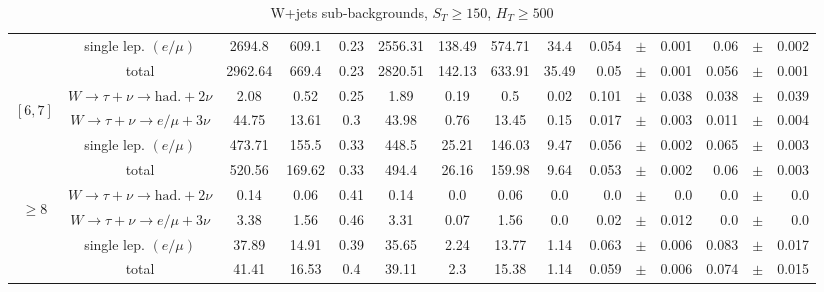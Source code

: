 \documentclass[12pt]{paper}
\begin{document}
\begin{table}[ht]
\begin{center}
{\begin{tabular}{|c|c|c|c|c|c|c|c|c|rrr|rrr|}
\cline{2-15}
 &single lep. $(e/\mu)$ & 2694.8 & 609.1 & 0.23 & 2556.31 & 138.49 & 574.71 & 34.4 & 0.054 & $\pm$ & 0.001 & 0.06 & $\pm$ & 0.002\\
\cline{2-15}
 &total & 2962.64 & 669.4 & 0.23 & 2820.51 & 142.13 & 633.91 & 35.49 & 0.05 & $\pm$ & 0.001 & 0.056 & $\pm$ & 0.001\\
\hline
\hline\multirow{4}{*}{\begin{sideways}$[6,7]$\end{sideways}}
 &$W\rightarrow \tau + \nu \rightarrow \textrm{had.}+2\nu$ & 2.08 & 0.52 & 0.25 & 1.89 & 0.19 & 0.5 & 0.02 & 0.101 & $\pm$ & 0.038 & 0.038 & $\pm$ & 0.039\\
\cline{2-15}
 &$W\rightarrow \tau + \nu \rightarrow e/\mu+3\nu$ & 44.75 & 13.61 & 0.3 & 43.98 & 0.76 & 13.45 & 0.15 & 0.017 & $\pm$ & 0.003 & 0.011 & $\pm$ & 0.004\\
\cline{2-15}
 &single lep. $(e/\mu)$ & 473.71 & 155.5 & 0.33 & 448.5 & 25.21 & 146.03 & 9.47 & 0.056 & $\pm$ & 0.002 & 0.065 & $\pm$ & 0.003\\
\cline{2-15}
 &total & 520.56 & 169.62 & 0.33 & 494.4 & 26.16 & 159.98 & 9.64 & 0.053 & $\pm$ & 0.002 & 0.06 & $\pm$ & 0.003\\
\hline
\hline\multirow{4}{*}{\begin{sideways}$\geq8$\end{sideways}}
 &$W\rightarrow \tau + \nu \rightarrow \textrm{had.}+2\nu$ & 0.14 & 0.06 & 0.41 & 0.14 & 0.0 & 0.06 & 0.0 & 0.0 & $\pm$ & 0.0 & 0.0 & $\pm$ & 0.0\\
\cline{2-15}
 &$W\rightarrow \tau + \nu \rightarrow e/\mu+3\nu$ & 3.38 & 1.56 & 0.46 & 3.31 & 0.07 & 1.56 & 0.0 & 0.02 & $\pm$ & 0.012 & 0.0 & $\pm$ & 0.0\\
\cline{2-15}
 &single lep. $(e/\mu)$ & 37.89 & 14.91 & 0.39 & 35.65 & 2.24 & 13.77 & 1.14 & 0.063 & $\pm$ & 0.006 & 0.083 & $\pm$ & 0.017\\
\cline{2-15}
 &total & 41.41 & 16.53 & 0.4 & 39.11 & 2.3 & 15.38 & 1.14 & 0.059 & $\pm$ & 0.006 & 0.074 & $\pm$ & 0.015\\
\hline
\end{tabular}}
\end{center}
\vspace{2pt}
\caption{W+jets sub-backgrounds, $S_T\geq150$, $H_T\geq500$}
\end{table}
\end{document}
